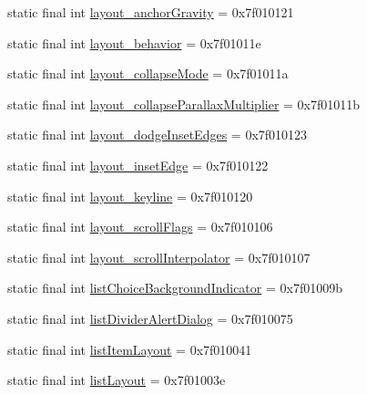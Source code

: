 \begin{CompactItemize}
\item 
static final int \hyperlink{classandroid_1_1support_1_1v7_1_1mediarouter_1_1_r_1_1attr_1a69f8bb53538cc3ee1f48555fcd0a2d}{layout\_\-anchorGravity} = 0x7f010121
\item 
static final int \hyperlink{classandroid_1_1support_1_1v7_1_1mediarouter_1_1_r_1_1attr_8555c73e016a71372ba3e476e3416857}{layout\_\-behavior} = 0x7f01011e
\item 
static final int \hyperlink{classandroid_1_1support_1_1v7_1_1mediarouter_1_1_r_1_1attr_f2d5f9ae4316a92e410dee587b3badb1}{layout\_\-collapseMode} = 0x7f01011a
\item 
static final int \hyperlink{classandroid_1_1support_1_1v7_1_1mediarouter_1_1_r_1_1attr_91ceeb7940aff670452731b0c47d5bb6}{layout\_\-collapseParallaxMultiplier} = 0x7f01011b
\item 
static final int \hyperlink{classandroid_1_1support_1_1v7_1_1mediarouter_1_1_r_1_1attr_0bb7f6857234f4bbb7e225b5f7758d37}{layout\_\-dodgeInsetEdges} = 0x7f010123
\item 
static final int \hyperlink{classandroid_1_1support_1_1v7_1_1mediarouter_1_1_r_1_1attr_d8110304b35f9662f6578d1418b3a355}{layout\_\-insetEdge} = 0x7f010122
\item 
static final int \hyperlink{classandroid_1_1support_1_1v7_1_1mediarouter_1_1_r_1_1attr_e56f2493fea933a070c0d376edcb2a8f}{layout\_\-keyline} = 0x7f010120
\item 
static final int \hyperlink{classandroid_1_1support_1_1v7_1_1mediarouter_1_1_r_1_1attr_47faa98761bfd1dfa0f5883ae716fff4}{layout\_\-scrollFlags} = 0x7f010106
\item 
static final int \hyperlink{classandroid_1_1support_1_1v7_1_1mediarouter_1_1_r_1_1attr_216b3aef534f4a838a50e43c7d085985}{layout\_\-scrollInterpolator} = 0x7f010107
\item 
static final int \hyperlink{classandroid_1_1support_1_1v7_1_1mediarouter_1_1_r_1_1attr_c5e61e9f4da176fbf01baa9d6f10eefe}{listChoiceBackgroundIndicator} = 0x7f01009b
\item 
static final int \hyperlink{classandroid_1_1support_1_1v7_1_1mediarouter_1_1_r_1_1attr_ccae51845ff93d868c1dad649026a3a9}{listDividerAlertDialog} = 0x7f010075
\item 
static final int \hyperlink{classandroid_1_1support_1_1v7_1_1mediarouter_1_1_r_1_1attr_d9a88357394fe76a15c6508fb1fee0ce}{listItemLayout} = 0x7f010041
\item 
static final int \hyperlink{classandroid_1_1support_1_1v7_1_1mediarouter_1_1_r_1_1attr_eacc532bb2e5f243945340bea92c5a51}{listLayout} = 0x7f01003e

\end{CompactItemize}
